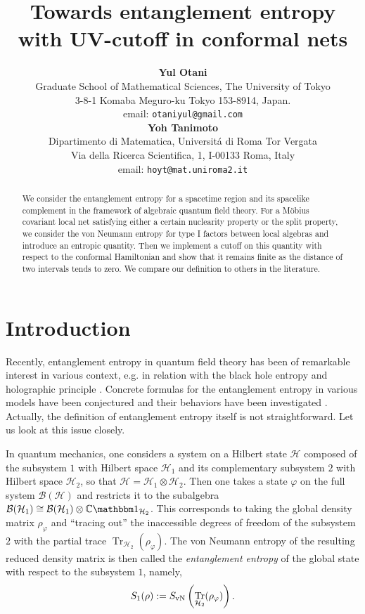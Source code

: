 \documentclass[a4paper,12pt]{article}
\title{Towards entanglement entropy with UV-cutoff in conformal nets}
\date{}
\author{
{\bf Yul Otani} \\
Graduate School of Mathematical Sciences, The University of Tokyo\\
3-8-1 Komaba Meguro-ku Tokyo 153-8914, Japan.\\
 email: {\tt otaniyul@gmail.com}
   \vspace{0.5cm}\\
   {\bf Yoh Tanimoto} \\%
   Dipartimento di Matematica, Universit\'a di Roma Tor Vergata\\
   Via della Ricerca Scientifica, 1, I-00133 Roma, Italy\\
   email: {\tt hoyt@mat.uniroma2.it}
}
\theoremstyle{plain}
\theoremstyle{definition}
\theoremstyle{remark}
\newcommand{\Svn}{S_{\rm vN}}
\def\CC{{\mathbb C}}
\def\B{{\mathcal B}}
\def\H{{\mathcal H}}
\def\f{\varphi}
\def\1{{\mathbbm 1}}
\DeclareMathOperator{\Tr}{Tr}
\begin{document}
\maketitle
\begin{abstract}
We consider the entanglement entropy for a spacetime region and its spacelike complement
in the framework of algebraic quantum field theory.
For a M\"obius covariant local net satisfying either a certain nuclearity property or the split property,
we consider the von Neumann entropy for type I factors between local algebras
and introduce an entropic quantity.
Then we implement a cutoff on this quantity with respect to the conformal Hamiltonian
and show that it remains finite as the distance of two intervals tends to zero.
We compare our definition to others in the literature.
\end{abstract}
\section{Introduction}\label{sec:intro}

Recently, entanglement entropy in quantum field theory has been of remarkable interest in various context,
e.g.\! in relation with the black hole entropy \cite{bkls86, CW94, srednicki93} and holographic principle \cite{ryutak06}.
Concrete formulas for the entanglement entropy in various models have been conjectured and their behaviors have been
investigated \cite{cashue09}.
Actually, the definition of entanglement entropy itself is not straightforward.
Let us look at this issue closely.

In quantum mechanics, one considers a system on a Hilbert state $\H$ composed of
the subsystem $1$ with Hilbert space $\H_1$ and its complementary subsystem $2$ with Hilbert space $\H_{2}$,
so that $\H = \H_1\otimes \H_{2}$.
Then one takes a state $\f$ on the full system $\B(\H)$ and restricts it to the subalgebra
$\B(\H_1) \cong \B(\H_1)\otimes \CC\1_{\H_{2}}$.
This corresponds to taking the global density matrix $\rho_\f$ and ``tracing out'' the inaccessible degrees of freedom
of the subsystem $2$ with the partial trace $\Tr_{\H_{2}}(\rho_\f)$.
The von Neumann entropy of the resulting reduced density matrix is then called
the \emph{entanglement entropy} of the global state with respect to the subsystem $1$, namely,
\[
  S_1(\rho) := \Svn\left(\Tr_{\H_{2}}(\rho_\f)\right).
\]
\end{document}
